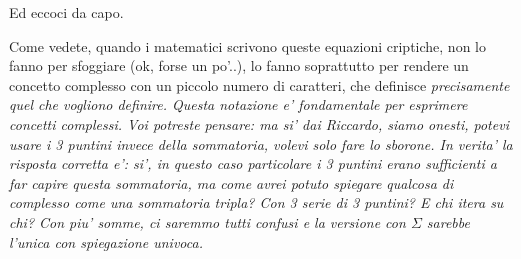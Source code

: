Ed eccoci da capo.

Come vedete, quando i matematici scrivono queste equazioni criptiche, non lo fanno per sfoggiare (ok, forse un po'..),
lo fanno soprattutto per rendere un concetto complesso con un piccolo numero di caratteri, che definisce \em{precisamente}
quel che vogliono definire. Questa notazione e' fondamentale per esprimere concetti complessi. Voi potreste pensare: ma si'
dai Riccardo, siamo onesti, potevi usare i 3 puntini invece della sommatoria, volevi solo fare lo sborone. In verita' la
risposta corretta e': si', in questo caso particolare i 3 puntini erano sufficienti a far capire questa sommatoria, ma come
avrei potuto spiegare qualcosa di complesso come una sommatoria tripla? Con 3 serie di 3 puntini? E chi itera su chi? Con 
piu' somme, ci saremmo tutti confusi e la versione con $\varSigma$ sarebbe l'unica con spiegazione univoca.
